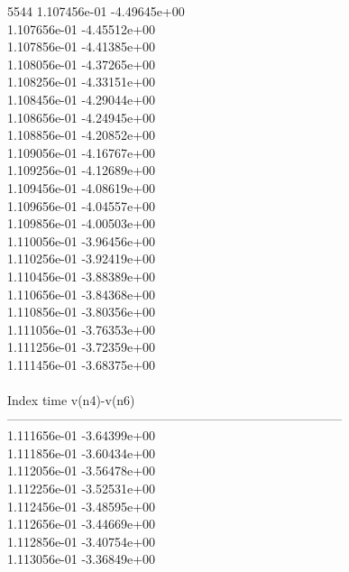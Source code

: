 5544	1.107456e-01	-4.49645e+00	\\ 	1.107656e-01	-4.45512e+00	\\ 	1.107856e-01	-4.41385e+00	\\ 	1.108056e-01	-4.37265e+00	\\ 	1.108256e-01	-4.33151e+00	\\ 	1.108456e-01	-4.29044e+00	\\ 	1.108656e-01	-4.24945e+00	\\ 	1.108856e-01	-4.20852e+00	\\ 	1.109056e-01	-4.16767e+00	\\ 	1.109256e-01	-4.12689e+00	\\ 	1.109456e-01	-4.08619e+00	\\ 	1.109656e-01	-4.04557e+00	\\ 	1.109856e-01	-4.00503e+00	\\ 	1.110056e-01	-3.96456e+00	\\ 	1.110256e-01	-3.92419e+00	\\ 	1.110456e-01	-3.88389e+00	\\ 	1.110656e-01	-3.84368e+00	\\ 	1.110856e-01	-3.80356e+00	\\ 	1.111056e-01	-3.76353e+00	\\ 	1.111256e-01	-3.72359e+00	\\ 	1.111456e-01	-3.68375e+00	\\ \hline
\\ \hline
Index   time            v(n4)-v(n6)     \\ \hline
--------------------------------------------------------------------------------\\ 	1.111656e-01	-3.64399e+00	\\ 	1.111856e-01	-3.60434e+00	\\ 	1.112056e-01	-3.56478e+00	\\ 	1.112256e-01	-3.52531e+00	\\ 	1.112456e-01	-3.48595e+00	\\ 	1.112656e-01	-3.44669e+00	\\ 	1.112856e-01	-3.40754e+00	\\ 	1.113056e-01	-3.36849e+00	\\ \hline
